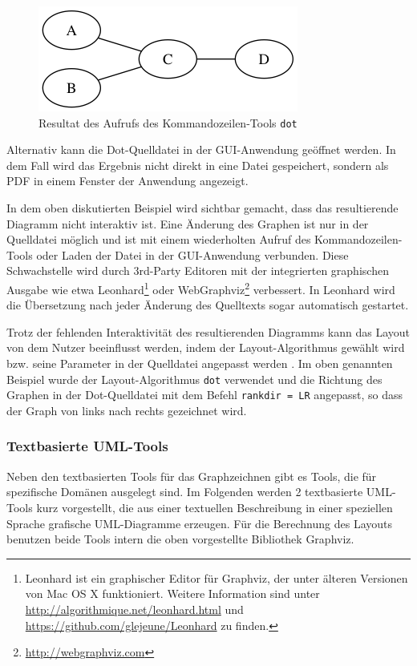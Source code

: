 \begin{figure}[hbt]
    \centering
    \includegraphics[scale=0.75]{resources/graphviz-dot-example.png}
    \caption{Resultat des Aufrufs des Kommandozeilen-Tools \lstinline{dot}}
    \label{fig:graphviz-dot-example}
\end{figure}

Alternativ kann die Dot-Quelldatei in der GUI-Anwendung geöffnet werden. In dem Fall wird das Ergebnis nicht direkt in eine Datei gespeichert, sondern als PDF in einem Fenster der Anwendung angezeigt.

In dem oben diskutierten Beispiel wird sichtbar gemacht, dass das resultierende Diagramm nicht interaktiv ist. Eine Änderung des Graphen ist nur in der Quelldatei möglich und ist mit einem wiederholten Aufruf des Kommandozeilen-Tools oder Laden der Datei in der GUI-Anwendung verbunden. Diese Schwachstelle wird durch 3rd-Party Editoren mit der integrierten graphischen Ausgabe wie etwa Leonhard\footnote{Leonhard ist ein graphischer Editor für Graphviz, der unter älteren Versionen von Mac OS X funktioniert. Weitere Information sind unter \url{http://algorithmique.net/leonhard.html} und \url{https://github.com/glejeune/Leonhard} zu finden.} oder WebGraphviz\footnote{\url{http://webgraphviz.com}} verbessert. In Leonhard wird die Übersetzung nach jeder Änderung des Quelltexts sogar automatisch gestartet.

Trotz der fehlenden Interaktivität des resultierenden Diagramms kann das Layout von dem Nutzer beeinflusst werden, indem der Layout-Algorithmus gewählt wird bzw. seine Parameter in der Quelldatei angepasst werden \cite{NorthGansner14Dot-Manual}. Im oben genannten Beispiel wurde der Layout-Algorithmus \lstinline{dot} verwendet und die Richtung des Graphen in der Dot-Quelldatei mit dem Befehl \lstinline{rankdir = LR} angepasst, so dass der Graph von links nach rechts gezeichnet wird.

\subsubsection{Textbasierte UML-Tools}

Neben den textbasierten Tools für das Graphzeichnen gibt es Tools, die für spezifische Domänen ausgelegt sind. Im Folgenden werden 2 textbasierte UML-Tools kurz vorgestellt, die aus einer textuellen Beschreibung in einer speziellen Sprache grafische UML-Diagramme erzeugen. Für die Berechnung des Layouts benutzen beide Tools intern die oben vorgestellte Bibliothek Graphviz.


